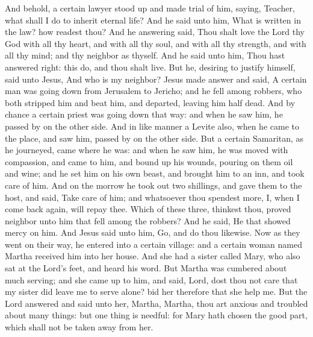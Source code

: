 And behold, a certain lawyer stood up and made trial of him, saying, Teacher, what shall I do to inherit eternal life? And he said unto him, What is written in the law? how readest thou? And he answering said, Thou shalt love the Lord thy God with all thy heart, and with all thy soul, and with all thy strength, and with all thy mind; and thy neighbor as thyself. And he said unto him, Thou hast answered right: this do, and thou shalt live. But he, desiring to justify himself, said unto Jesus, And who is my neighbor? Jesus made answer and said, A certain man was going down from Jerusalem to Jericho; and he fell among robbers, who both stripped him and beat him, and departed, leaving him half dead. And by chance a certain priest was going down that way: and when he saw him, he passed by on the other side. And in like manner a Levite also, when he came to the place, and saw him, passed by on the other side. But a certain Samaritan, as he journeyed, came where he was: and when he saw him, he was moved with compassion, and came to him, and bound up his wounds, pouring on them oil and wine; and he set him on his own beast, and brought him to an inn, and took care of him. And on the morrow he took out two shillings, and gave them to the host, and said, Take care of him; and whatsoever thou spendest more, I, when I come back again, will repay thee. Which of these three, thinkest thou, proved neighbor unto him that fell among the robbers? And he said, He that showed mercy on him. And Jesus said unto him, Go, and do thou likewise.  Now as they went on their way, he entered into a certain village: and a certain woman named Martha received him into her house. And she had a sister called Mary, who also sat at the Lord’s feet, and heard his word. But Martha was cumbered about much serving; and she came up to him, and said, Lord, dost thou not care that my sister did leave me to serve alone? bid her therefore that she help me. But the Lord answered and said unto her, Martha, Martha, thou art anxious and troubled about many things: but one thing is needful: for Mary hath chosen the good part, which shall not be taken away from her. 

